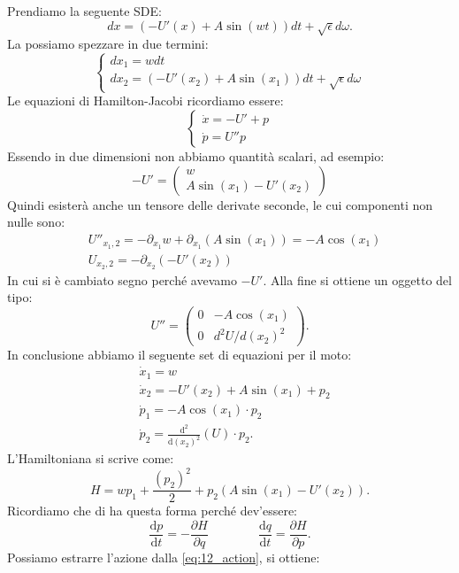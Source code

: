 \begin{exmp}[]
    Prendiamo la seguente SDE:
    \[
	 dx = (-U'(x) + A\sin (wt) ) dt + \sqrt{\epsilon} d\omega    
    .\] 
    La possiamo spezzare in due termini:
    \[
	\begin{cases}
	 dx_1 = w dt\\
	 dx_2 = (-U'(x_2) + A\sin (x_1) ) dt + \sqrt{\epsilon} d\omega    
	\end{cases}
    \] 
    Le equazioni di Hamilton-Jacobi ricordiamo essere:
    \[
        \begin{cases}
            \dot{x}= -U' + p\\
	    \dot{p} = U'' p
        \end{cases}
    \] 
    Essendo in due dimensioni non abbiamo quantità scalari, ad esempio:
    \[
        -U' = 
	\begin{pmatrix} 
	    w  \\
	    A\sin (x_1) -U'(x_2) 
	\end{pmatrix} 
    \] 
    Quindi esisterà anche un tensore delle derivate seconde, le cui componenti non nulle sono:
    \[\begin{aligned}
	& U''_{x_1, 2} = -\partial_{x_1}w + \partial_{x_1}(A\sin (x_1)) = -A\cos (x_1) \\
	& U_{x_2,2} = -\partial_{x_2} (-U'(x_2) ) 
    \end{aligned}\]
    In cui si è cambiato segno perché avevamo $-U'$. Alla fine si ottiene un oggetto del tipo:
    \[
        U'' = 
	\begin{pmatrix} 
	    0  &  -A\cos (x_1) \\
	    0  &  d^2U/d(x_2)^2
	\end{pmatrix} 
    .\] 
    In conclusione abbiamo il seguente set di equazioni per il moto:
    \[\begin{aligned}
	&\dot{x}_1 = w\\
	&\dot{x}_2 = -U'(x_2) + A \sin (x_1) + p_2 \\
	& \dot{p}_1 = -A\cos (x_1) \cdot p_2\\
	& \dot{p}_2 = \frac{\text{d}^2}{\text{d} (x_2)^2 }(U) \cdot  p_2
    .\end{aligned}\]
    L'Hamiltoniana si scrive come:
    \[
	H = w p_1 + \frac{(p_2)^2}{2} + p_2(A\sin (x_1) - U'(x_2) ) 
    .\] 
    Ricordiamo che di ha questa forma perché dev'essere:
    \[
        \frac{\text{d} p}{\text{d} t} = - \frac{\partial H}{\partial q}  
	\qquad \qquad
	\frac{\text{d} q}{\text{d} t} = \frac{\partial H}{\partial p} 
    .\] 
    Possiamo estrarre l'azione dalla \ref{eq:12_action}, si ottiene:

\end{exmp}
